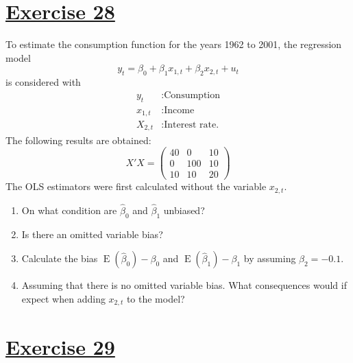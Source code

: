 \documentclass[captions=tableheading, 12pt, headings=small, parskip=half]{scrartcl}
\begin{document}
\section*{\underline{Exercise 28}}
To estimate the consumption function for the years 1962 to 2001, the regression model
\[y_t = \beta_0 + \beta_1x_{1,t} + \beta_2x_{2,t} + u_t\]
is considered with
\begin{align*}
	y_t&: \text{Consumption}\\
	x_{1,t} &: \text{Income}\\
	X_{2,t} &: \text{Interest rate.}
\end{align*}The following results are obtained:
\[X'X = \begin{pmatrix}40&0&10\\0&100&10\\10&10&20\end{pmatrix}\]
The OLS estimators were first calculated without the variable $x_{2,t}$.
\begin{enumerate}[label = \alph*)]
	\item On what condition are $\hat{\beta}_0$ and $\hat{\beta}_1$ unbiased?
	\item Is there an omitted variable bias?
	\item Calculate the bias $\operatorname{E}(\hat{\beta}_0) - \beta_0$ and $\operatorname{E}(\hat{\beta}_1) - \beta_1$ by assuming $\beta_2 = -0.1$.
	\item Assuming that there is no omitted variable bias. What consequences would if expect when adding $x_{2,t}$ to the model?
\end{enumerate}


\section*{\underline{Exercise 29}}
\end{document}
